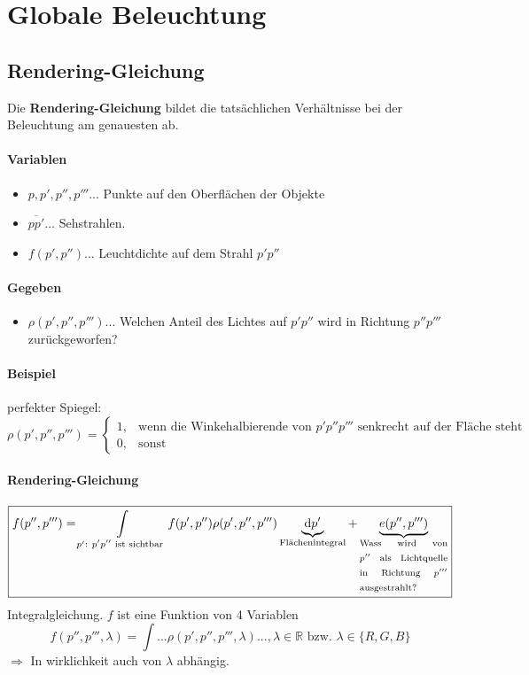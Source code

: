 \section{Globale Beleuchtung}
\begin{center}
\end{center}
\subsection{Rendering-Gleichung}
Die \textbf{Rendering-Gleichung} bildet die tatsächlichen Verhältnisse bei der Beleuchtung am genauesten ab.
\begin{center}
\end{center}
\paragraph*{Variablen}
\begin{itemize}
 \item $p, p', p'', p'''...$ Punkte auf den Oberflächen der Objekte
 \item $\overline{pp'}...$ Sehstrahlen.
 \item $f(p',p'')...$ Leuchtdichte auf dem Strahl $p'p''$
\end{itemize}
\paragraph*{Gegeben}
\begin{itemize}
 \item $\rho(p',p'',p''')...$ Welchen Anteil des Lichtes auf $p'p''$ wird in Richtung $p''p'''$ zurückgeworfen?
\end{itemize}
\paragraph{Beispiel} perfekter Spiegel:
	\[
		\rho(p',p'',p''') = \begin{cases}
		                     1,& \text{wenn die Winkehalbierende von $p'p''p'''$ senkrecht auf der Fläche steht}\\
		                     0,& \text{sonst}
		                    \end{cases}
	\]
\paragraph{Rendering-Gleichung}
\[\boxed{f(p'',p''') = \int\limits_{p'{:}\ \text{$p'p''$ ist sichtbar}} f(p',p'') \rho(p',p'',p''')
	\underbrace{\mathrm{d}p'}_{\text{Flächenintegral}}
	+ \underbrace{e(p'',p''')}_{
		\text{\begin{minipage}{2.5cm}
			Wass wird von $p''$ als Lichtquelle in Richtung $p'''$ ausgestrahlt?
		\end{minipage}}}}
\]
Integralgleichung. $f$ ist eine Funktion von 4 Variablen
\[f(p'',p''',\lambda) = \int ... \rho(p',p'',p''',\lambda) ..., \lambda \in \mathbb{R} \text{ bzw. } \lambda \in \{R,G,B\}\]
$\Rightarrow$ In wirklichkeit auch von $\lambda$ abhängig.
